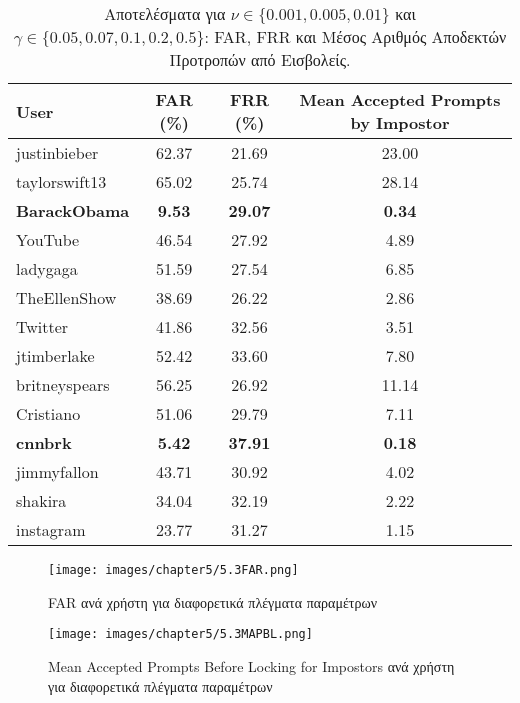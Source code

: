 \begin{table}[H]
\centering
\begin{tabular}{|l|c|c|c|}
\hline
\textbf{User} & \textbf{FAR (\%)} & \textbf{FRR (\%)} & \textbf{Mean Accepted Prompts by Impostor} \\ \hline
justinbieber & 62.37 & 21.69 & 23.00 \\ \hline
taylorswift13 & 65.02 & 25.74 & 28.14 \\ \hline
\textbf{BarackObama} & \textbf{9.53} & \textbf{29.07} & \textbf{0.34} \\ \hline
YouTube & 46.54 & 27.92 & 4.89 \\ \hline
ladygaga & 51.59 & 27.54 & 6.85 \\ \hline
TheEllenShow & 38.69 & 26.22 & 2.86 \\ \hline
Twitter & 41.86 & 32.56 & 3.51 \\ \hline
jtimberlake & 52.42 & 33.60 & 7.80 \\ \hline
britneyspears & 56.25 & 26.92 & 11.14 \\ \hline
Cristiano & 51.06 & 29.79 & 7.11 \\ \hline
\textbf{cnnbrk} & \textbf{5.42} & \textbf{37.91} & \textbf{0.18} \\ \hline
jimmyfallon & 43.71 & 30.92 & 4.02 \\ \hline
shakira & 34.04 & 32.19 & 2.22 \\ \hline
instagram & 23.77 & 31.27 & 1.15 \\ \hline
\end{tabular}
\caption{Αποτελέσματα για $\nu \in \{0.001, 0.005, 0.01\}$ και $\gamma \in \{0.05, 0.07, 0.1, 0.2, 0.5\}$: FAR, FRR και Μέσος Αριθμός Αποδεκτών Προτροπών από Εισβολείς.}
\label{tab:third_grid_results}
\end{table}


\begin{figure}[H]
    \centering
    \texttt{[image: images/chapter5/5.3FAR.png]}
    \caption{FAR ανά χρήστη για διαφορετικά πλέγματα παραμέτρων}
    \label{fig:chapter5_image53FAR}
\end{figure}

\begin{figure}[H]
    \centering
    \texttt{[image: images/chapter5/5.3MAPBL.png]}
    \caption{Mean Accepted Prompts Before Locking for Impostors ανά χρήστη για διαφορετικά πλέγματα παραμέτρων}
    \label{fig:chapter5_image53MAPBL}
\end{figure}

